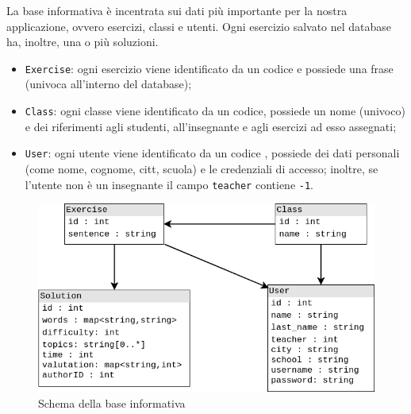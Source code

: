 La base informativa è incentrata sui dati più importante per la nostra applicazione, ovvero esercizi, classi e utenti. Ogni esercizio salvato nel database ha, inoltre, una o più soluzioni.

\begin{itemize}
	\item \texttt{Exercise}: ogni esercizio viene identificato da un codice e possiede una frase (univoca all'interno del database);
	\item \texttt{Class}: ogni classe viene identificato da un codice, possiede un nome (univoco) e dei riferimenti agli studenti, all'insegnante e agli esercizi ad esso assegnati;
	\item \texttt{User}: ogni utente viene identificato da un codice , possiede dei dati personali (come nome, cognome, citt, scuola) e le credenziali di accesso; inoltre, se l'utente non è un insegnante il campo \texttt{teacher} contiene \texttt{-1}.
\end{itemize}

\begin{figure}[ht]
	\centering
	\includegraphics[scale=0.65]{images/database.png}
	\caption{Schema della base informativa}
\end{figure}